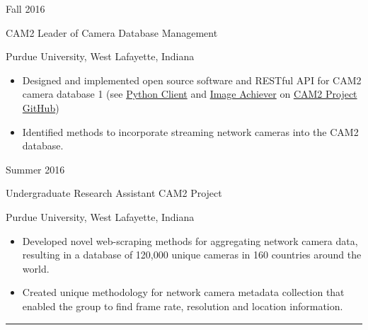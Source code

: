 \documentclass[10pt]{article}
\newlength{\cvcolumngapwidth}
\newlength{\cvleftcolumnwidth}
\newlength{\cvrightcolumnwidth}
\newcommand{\cvsectionstyle}[1]{{\normalsize\cvsectionfont\textcolor{cvsectioncolor}{#1}}}
\newcommand{\cvtitlestyle}[1]{{\large\cvtitlefont\textcolor{cvtitlecolor}{#1}}}
\newcommand{\cvdurationstyle}[1]{{\small\cvdurationfont\textcolor{cvdurationcolor}{#1}}}
\newlength{\cvafteritemskipamount}
\newlength{\cvaftersectionskipamount}
\newlength{\cvparskip}
\newcommand{\cvsection}[1]{
    \begin{minipage}[t]{\cvleftcolumnwidth}
        \raggedleft\cvsectionstyle{#1}
    \end{minipage}%
    \hspace{\cvcolumngapwidth}%
    \begin{minipage}[t]{\cvrightcolumnwidth}
        \textcolor{cvrulecolor}{\rule{\cvrightcolumnwidth}{0.3mm}}
    \end{minipage}

    \vspace{\cvaftersectionskipamount}
}
\newcommand{\cvitem}[2]{
    \begin{minipage}[t]{\cvleftcolumnwidth}
        \raggedleft #1
    \end{minipage}%
    \hspace{\cvcolumngapwidth}%
    \begin{minipage}[t]{\cvrightcolumnwidth}
        \setlength{\parskip}{\cvparskip} #2
    \end{minipage}

    \vspace{\cvafteritemskipamount}
}
\newcommand{\cvtitle}[1]{
    \cvtitlestyle{#1}

    \vspace{1mm plus 0.25mm minus 0.25mm}
    \vspace{-\cvparskip}
}
\def\online{1}
\begin{document}
\cvitem{
    \cvdurationstyle{Fall 2016}
}{
    \cvtitle{CAM2 Leader of Camera Database Management}

    Purdue University, West Lafayette, Indiana

    \begin{itemize}[leftmargin=*]
        \item Designed and implemented open source software and RESTful API for CAM2 camera database 
        \if\online1 (see \href{https://github.com/PurdueCAM2Project/CameraDatabaseClient}{Python Client} and \href{https://github.com/PurdueCAM2Project/CAM2ImageArchiver}{Image Achiever} on \href{https://github.com/PurdueCAM2Project}{CAM2 Project GitHub})\fi
        \item Identified methods to incorporate streaming network cameras into the CAM2 database.
    \end{itemize}
}

\cvitem{
    \cvdurationstyle{Summer 2016}
}{
    \cvtitle{Undergraduate Research Assistant CAM2 Project}

    Purdue University, West Lafayette, Indiana

    \begin{itemize}[leftmargin=*]
        \item Developed novel web-scraping methods for aggregating network camera data, resulting in a database of 120,000 unique cameras in 160 countries around the world.
        \item Created unique methodology for network camera metadata collection that enabled the group to find frame rate, resolution and location information.
    \end{itemize}
}

\cvsection{PUBLICATIONS}
\end{document}
